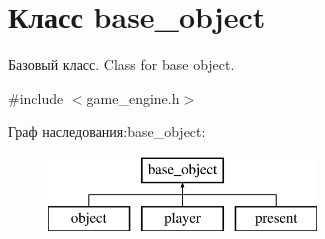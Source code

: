 \hypertarget{classbase__object}{}\section{Класс base\+\_\+object}
\label{classbase__object}


Базовый класс. Class for base object.  




{\ttfamily \#include $<$game\+\_\+engine.\+h$>$}

Граф наследования\+:base\+\_\+object\+:\begin{figure}[H]
\begin{center}
\leavevmode
\includegraphics[height=2.000000cm]{classbase__object}
\end{center}
\end{figure}

